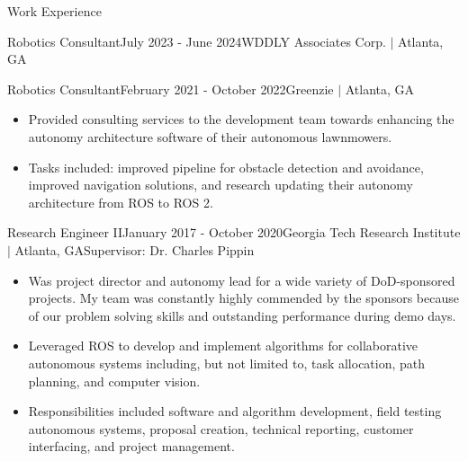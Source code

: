 \documentclass{resume} %
\begin{document}
\begin{rSection}{Work Experience}
\begin{rSubsection}{Robotics Consultant}{July 2023 - June 2024}{WDDLY Associates Corp. $\vert$ Atlanta, GA}{}
\end{rSubsection}


\begin{rSubsection}{Robotics Consultant}{February 2021 - October 2022}{Greenzie $\vert$ Atlanta, GA}{}

\item
\begin{itemize}
\item Provided consulting services to the development team towards enhancing
  the autonomy architecture software of their autonomous lawnmowers.

\item Tasks included: improved pipeline for obstacle detection and avoidance,
  improved navigation solutions, and research updating their autonomy
  architecture from ROS to ROS 2.
\end{itemize}

\end{rSubsection}


\begin{rSubsection}{Research Engineer II}{January 2017 - October 2020}{Georgia Tech Research Institute $\vert$ Atlanta, GA}{Supervisor: Dr. Charles Pippin}

\item
\begin{itemize}
\item Was project director and autonomy lead for a wide variety of
  DoD-sponsored projects. My team was constantly highly commended by the
  sponsors because of our problem solving skills and outstanding performance
  during demo days.

\item Leveraged ROS to develop and implement algorithms for collaborative
  autonomous systems including, but not limited to, task allocation, path
  planning, and computer vision.

\item Responsibilities included software and algorithm development, field
  testing autonomous systems, proposal creation, technical reporting, customer
  interfacing, and project management.

\end{itemize}

\end{rSubsection}



\end{rSection}
\end{document}
